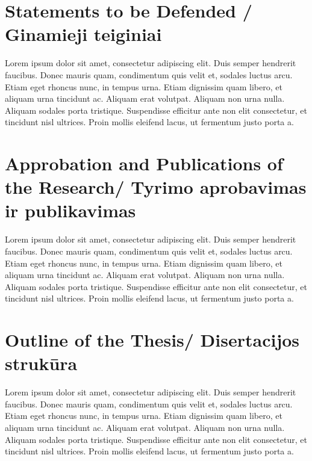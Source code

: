 \section*{Statements to be Defended / Ginamieji teiginiai}

Lorem ipsum dolor sit amet, consectetur adipiscing elit. Duis semper hendrerit faucibus. Donec mauris quam, condimentum quis velit et, sodales luctus arcu. Etiam eget rhoncus nunc, in tempus urna. Etiam dignissim quam libero, et aliquam urna tincidunt ac. Aliquam erat volutpat. Aliquam non urna nulla. Aliquam sodales porta tristique. Suspendisse efficitur ante non elit consectetur, et tincidunt nisl ultrices. Proin mollis eleifend lacus, ut fermentum justo porta a.


\section*{Approbation and Publications of the Research/ Tyrimo aprobavimas ir publikavimas} %

Lorem ipsum dolor sit amet, consectetur adipiscing elit. Duis semper hendrerit faucibus. Donec mauris quam, condimentum quis velit et, sodales luctus arcu. Etiam eget rhoncus nunc, in tempus urna. Etiam dignissim quam libero, et aliquam urna tincidunt ac. Aliquam erat volutpat. Aliquam non urna nulla. Aliquam sodales porta tristique. Suspendisse efficitur ante non elit consectetur, et tincidunt nisl ultrices. Proin mollis eleifend lacus, ut fermentum justo porta a.


\section*{Outline of the Thesis/ Disertacijos strukūra}

Lorem ipsum dolor sit amet, consectetur adipiscing elit. Duis semper hendrerit faucibus. Donec mauris quam, condimentum quis velit et, sodales luctus arcu. Etiam eget rhoncus nunc, in tempus urna. Etiam dignissim quam libero, et aliquam urna tincidunt ac. Aliquam erat volutpat. Aliquam non urna nulla. Aliquam sodales porta tristique. Suspendisse efficitur ante non elit consectetur, et tincidunt nisl ultrices. Proin mollis eleifend lacus, ut fermentum justo porta a.